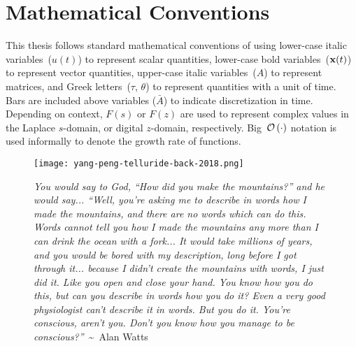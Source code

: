 \cleardoublepage
{}
\renewcommand\contentsname{Table of Contents}
\tableofcontents
\cleardoublepage
{}

\iffalse
\addcontentsline{toc}{chapter}{List of Todos}
\listoftodos
\cleardoublepage
\phantomsection
\fi

\listoftables
\cleardoublepage
{}

\listoffigures
\cleardoublepage
{}

\listoftheorems[ignoreall,show={theorem,lemma}]
\cleardoublepage
{}

\chapter*{Mathematical Conventions}
\label{typography}

This thesis follows standard mathematical conventions of using lower-case italic variables~($u(t)$) to represent scalar quantities, lower-case bold variables~($\mathbf{x}(t)$) to represent vector quantities, upper-case italic variables~($A$) to represent matrices, and Greek letters~($\tau$, $\theta$) to represent quantities with a unit of time.
Bars are included above variables ($\bar{A}$) to indicate discretization in time.
Depending on context, $F(s)$ or $F(z)$ are used to represent complex values in the Laplace $s$-domain, or digital $z$-domain, respectively.
Big~$\mathcal{O}\left({\cdot}\right)$ notation is used informally to denote the growth rate of functions.

\cleardoublepage
{}

\begin{figure}
\centering
\vspace*{\fill}
\begingroup
\texttt{[image: yang-peng-telluride-back-2018.png]}
\endgroup

\vspace{1em} 

\caption*{{\tiny \emph{You would say to God, ``How did you make the mountains?'' and he would say... ``Well, you're asking me to describe in words how I made the mountains, and there are no words which can do this. Words cannot tell you how I made the mountains any more than I can drink the ocean with a fork... It would take millions of years, and you would be bored with my description, long before I got through it... because I didn't create the mountains with words, I just did it. Like you open and close your hand. You know how you do this, but can you describe in words how you do it? Even a very good physiologist can't describe it in words. But you do it. You're conscious, aren't you. Don't you know how you manage to be conscious?''}~\textasciitilde~Alan Watts}}

\vspace*{\fill}
\end{figure}

\cleardoublepage
{}

